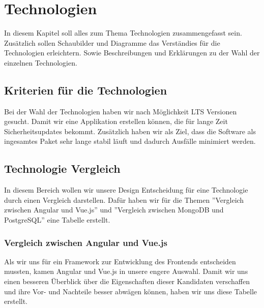 \section{Technologien}
In diesem Kapitel soll alles zum Thema Technologien zusammengefasst sein.
Zusätzlich sollen Schaubilder und Diagramme das Verständies für die Technologien erleichtern.
Sowie Beschreibungen und Erklärungen zu der Wahl der einzelnen Technologien.

\subsection{Kriterien für die Technologien}
Bei der Wahl der Technologien haben wir nach Möglichkeit LTS Versionen gesucht.
Damit wir eine Applikation erstellen können, die für lange Zeit Sicherheitsupdates
bekommt. Zusätzlich haben wir als Ziel, dass die Software als ingesamtes Paket sehr lange
stabil läuft und dadurch Ausfälle minimiert werden.

\subsection{Technologie Vergleich}
In diesem Bereich wollen wir unsere Design Entscheidung für eine Technologie durch einen Vergleich darstellen.
Dafür haben wir für die Themen ''Vergleich zwischen Angular und Vue.js'' und ''Vergleich zwischen MongoDB und PostgreSQL'' eine Tabelle erstellt.

\newpage
\subsubsection{Vergleich zwischen Angular und Vue.js}

Als wir uns für ein Framework zur Entwicklung des Frontends entscheiden mussten, kamen Angular und Vue.js in unsere engere Auswahl.
Damit wir uns einen besseren Überblick über die Eigenschaften dieser Kandidaten verschaffen und ihre Vor- und Nachteile besser abwägen können, 
haben wir uns diese Tabelle erstellt.

